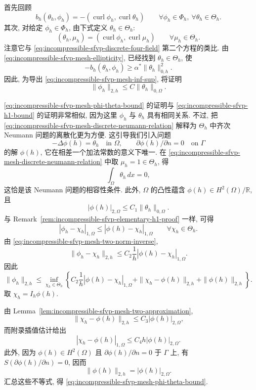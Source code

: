 \begin{Proof}
首先回顾
\[
b_h(\theta_h,\phi_h)
=-(\operatorname{curl}\phi_h,\operatorname{curl}\theta_h)
\qquad\forall\phi_h\in\Phi_h,
\ \forall\theta_h\in\Theta_h.
\]
其次, 对给定 $\phi_h\in\Phi_h$, 由下式定义
$\theta_h\in\Theta_h$:
\begin{equation}\label{eq:incompressible-sfvp-mesh-discrete-neumann-relation}
(\theta_h,\mu_h)
=(\operatorname{curl}\phi_h,\operatorname{curl}\mu_h)
\qquad\forall\mu_h\in\Theta_h.
\end{equation}
注意它与 \eqref{eq:incompressible-sfvp-discrete-four-field}
第二个方程的类比.
由 \eqref{eq:incompressible-sfvp-mesh-ellipticity},
已经找到 $\theta_h\in\Theta_h$, 使
\[
-b_h(\theta_h,\phi_h)
\geq\alpha^*\|\theta_h\|_{0,h}^2.
\]
因此, 为导出 \eqref{eq:incompressible-sfvp-mesh-inf-sup},
将证明
\begin{equation}\label{eq:incompressible-sfvp-mesh-phi-theta-bound}
\|\phi_h\|_{2,h}
\leq C\|\theta_h\|_{0,\Omega}.
\end{equation}

\eqref{eq:incompressible-sfvp-mesh-phi-theta-bound}
的证明与 \eqref{eq:incompressible-sfvp-h1-bound} 的证明非常相似,
因为这里 $\phi_h$ 与 $\theta_h$ 具有相同关系.
不过, 把 \eqref{eq:incompressible-sfvp-mesh-discrete-neumann-relation}
解释为 $\Theta_h$ 中齐次 Neumann 问题的离散化更为方便.
这引导我们引入问题
\[
-\Delta\phi(h)=\theta_h\quad\text{in }\Omega,
\qquad
\partial\phi(h)/\partial n=0\quad\text{on }\Gamma
\]
的解 $\phi(h)$, 它在相差一个加法常数的意义下唯一.
在 \eqref{eq:incompressible-sfvp-mesh-discrete-neumann-relation}
中取 $\mu_h=1\in\Theta_h$, 得
\[
\int_\Omega\theta_h\,dx=0,
\]
这恰是该 Neumann 问题的相容性条件.
此外, $\Omega$ 的凸性蕴含
$\phi(h)\in H^2(\Omega)/\mathbb R$, 且
\[
|\phi(h)|_{2,\Omega}
\leq C_1\|\theta_h\|_{0,\Omega}.
\]
与 Remark~\ref{rem:incompressible-sfvp-elementary-h1-proof} 一样, 可得
\[
|\phi_h-\chi_h|_{1,\Omega}
\leq|\phi(h)-\chi_h|_{1,\Omega}
\qquad\forall\chi_h\in\Theta_h.
\]
由 \eqref{eq:incompressible-sfvp-mesh-two-norm-inverse},
\[
\|\phi_h-\chi_h\|_{2,h}
\leq C_2\frac1h|\phi(h)-\chi_h|_{1,\Omega}.
\]
因此
\[
\|\phi_h\|_{2,h}
\leq\inf_{\chi_h\in\Theta_h}
\left\{
C_2\frac1h|\phi(h)-\chi_h|_{1,\Omega}
+\|\chi_h-\phi(h)\|_{2,h}
+\|\phi(h)\|_{2,h}
\right\}.
\]
取 $\chi_h=I_h\phi(h)$.

由 Lemma~\ref{lem:incompressible-sfvp-mesh-two-approximation},
\[
\|\chi_h-\phi(h)\|_{2,h}
\leq C_3|\phi(h)|_{2,\Omega},
\]
而附录插值估计给出
\[
|\chi_h-\phi(h)|_{1,\Omega}
\leq C_4h|\phi(h)|_{2,\Omega}.
\]
此外, 因为 $\phi(h)\in H^2(\Omega)$ 且
$\partial\phi(h)/\partial n=0$ 于 $\Gamma$ 上,
有 $S(\partial\phi(h)/\partial n)=0$, 因而
\[
\|\phi(h)\|_{2,h}=|\phi(h)|_{2,\Omega}.
\]
汇总这些不等式, 得
\eqref{eq:incompressible-sfvp-mesh-phi-theta-bound}.
\end{Proof}

